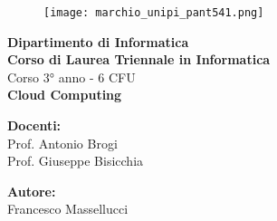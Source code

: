 \begin{titlepage} %
\begin{figure}[t] %
    \centering\texttt{[image: marchio\_unipi\_pant541.png]}
\end{figure}
\vspace{20mm}

\begin{Large}
 \begin{center}
	\textbf{Dipartimento di Informatica\\ Corso di Laurea Triennale in Informatica\\}
	\vspace{20mm}
    {\LARGE{Corso 3° anno - 6 CFU}}\\
	\vspace{10mm}
	{\huge{\bf Cloud Computing}}\\
\end{center}
\end{Large}


\vspace{36mm}
\begin{minipage}[t]{0.47\textwidth}
	{\large{\bf Docenti:}\\ 
    \large{Prof. Antonio Brogi}\\
    \large{Prof. Giuseppe Bisicchia}
    }
\end{minipage}
\hfill
\begin{minipage}[t]{0.47\textwidth}\raggedleft
	{\large{\bf Autore:}\\ \large{Francesco Massellucci}}
\end{minipage}

\vspace{25mm}

\hrulefill

\vspace{5mm}


\end{titlepage}